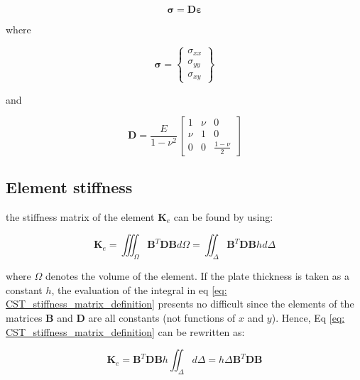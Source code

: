 \begin{equation}\label{eq: CST_stress}
\mathbf{\sigma} = \mathbf{D} \mathbf{\varepsilon}
\end{equation}

where

\begin{equation}
\mathbf{\sigma} = \left\lbrace \begin{array}{c}
\sigma_{xx} \\ 
\sigma_{yy} \\ 
\sigma_{xy}
\end{array}  \right\rbrace
\end{equation}

and

\begin{equation}\label{eq: CST_stress_strain_matrix}
\mathbf{D} = \frac{E}{1-\nu^2} \begin{bmatrix}
1 & \nu & 0 \\ 
\nu & 1 & 0 \\ 
0 & 0 & \frac{1-\nu}{2}
\end{bmatrix} 
\end{equation}

\subsection{Element stiffness}
the stiffness matrix of the element $ \mathbf{K}_e $ can be found by using:

\begin{equation}\label{eq: CST_stiffness_matrix_definition}
\mathbf{K}_e=\iiint_\Omega \mathbf{B}^T \mathbf{DB} d\Omega = \iint_\Delta \mathbf{B}^T \mathbf{DB} h d\Delta
\end{equation}

where $ \Omega $ denotes the volume of the element. If the plate thickness is taken as a constant $ h $, the evaluation of the integral in eq \ref{eq: CST_stiffness_matrix_definition} presents no difficult since the elements of the matrices $ \mathbf{B} $ and $ \mathbf{D} $ are all constants (not functions of $ x $ and $ y $). Hence, Eq \ref{eq: CST_stiffness_matrix_definition} can be rewritten as:

\begin{equation}\label{eq: CST_stiffness_matrix}
\mathbf{K}_e = \mathbf{B}^T \mathbf{DB} h \iint_\Delta   d\Delta =  h\Delta \mathbf{B}^T \mathbf{DB}
\end{equation}
